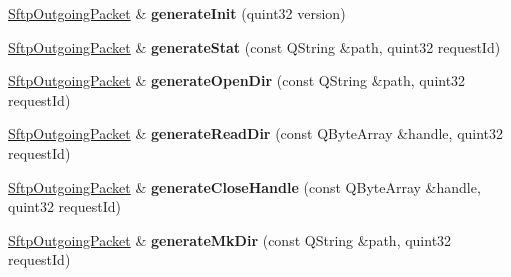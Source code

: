 \begin{DoxyCompactItemize}
\item 
\mbox{\label{class_q_ssh_1_1_internal_1_1_sftp_outgoing_packet_ac892ca18d86bad37242cd76f7541b5bc}} 
\mbox{\hyperlink{class_q_ssh_1_1_internal_1_1_sftp_outgoing_packet}{Sftp\+Outgoing\+Packet}} \& {\bfseries generate\+Init} (quint32 version)
\item 
\mbox{\label{class_q_ssh_1_1_internal_1_1_sftp_outgoing_packet_a749a57c2966eef0e10dfde18f9e5aefe}} 
\mbox{\hyperlink{class_q_ssh_1_1_internal_1_1_sftp_outgoing_packet}{Sftp\+Outgoing\+Packet}} \& {\bfseries generate\+Stat} (const Q\+String \&path, quint32 request\+Id)
\item 
\mbox{\label{class_q_ssh_1_1_internal_1_1_sftp_outgoing_packet_a9226337c0cb174808404e8e70b9eaf7b}} 
\mbox{\hyperlink{class_q_ssh_1_1_internal_1_1_sftp_outgoing_packet}{Sftp\+Outgoing\+Packet}} \& {\bfseries generate\+Open\+Dir} (const Q\+String \&path, quint32 request\+Id)
\item 
\mbox{\label{class_q_ssh_1_1_internal_1_1_sftp_outgoing_packet_a69ffa1ee91d1ea2c1d1f211766bc7675}} 
\mbox{\hyperlink{class_q_ssh_1_1_internal_1_1_sftp_outgoing_packet}{Sftp\+Outgoing\+Packet}} \& {\bfseries generate\+Read\+Dir} (const Q\+Byte\+Array \&handle, quint32 request\+Id)
\item 
\mbox{\label{class_q_ssh_1_1_internal_1_1_sftp_outgoing_packet_a5828cc14afa1f807a82eac0048ef0c02}} 
\mbox{\hyperlink{class_q_ssh_1_1_internal_1_1_sftp_outgoing_packet}{Sftp\+Outgoing\+Packet}} \& {\bfseries generate\+Close\+Handle} (const Q\+Byte\+Array \&handle, quint32 request\+Id)
\item 
\mbox{\label{class_q_ssh_1_1_internal_1_1_sftp_outgoing_packet_ae91ca71c7075a1f416552e1288ca713b}} 
\mbox{\hyperlink{class_q_ssh_1_1_internal_1_1_sftp_outgoing_packet}{Sftp\+Outgoing\+Packet}} \& {\bfseries generate\+Mk\+Dir} (const Q\+String \&path, quint32 request\+Id)
\item 

\end{DoxyCompactItemize}
